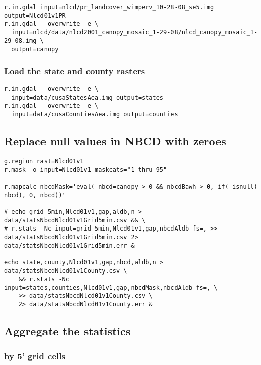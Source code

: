 \documentclass[11pt]{article}
\begin{document}
\begin{verbatim}
r.in.gdal input=nlcd/pr_landcover_wimperv_10-28-08_se5.img output=Nlcd01v1PR
r.in.gdal --overwrite -e \
  input=nlcd/data/nlcd2001_canopy_mosaic_1-29-08/nlcd_canopy_mosaic_1-29-08.img \
  output=canopy
\end{verbatim}
\subsubsection{Load the state and county rasters}
\label{sec-3-3-6}



\begin{verbatim}
r.in.gdal --overwrite -e \
  input=data/cusaStatesAea.img output=states
r.in.gdal --overwrite -e \
  input=data/cusaCountiesAea.img output=counties
\end{verbatim}
\subsection{Replace null values in NBCD with zeroes}
\label{sec-3-4}



\begin{verbatim}
g.region rast=Nlcd01v1
r.mask -o input=Nlcd01v1 maskcats="1 thru 95"

r.mapcalc nbcdMask='eval( nbcd=canopy > 0 && nbcdBawh > 0, if( isnull( nbcd), 0, nbcd))'

# echo grid_5min,Nlcd01v1,gap,aldb,n > data/statsNbcdNlcd01v1Grid5min.csv && \
# r.stats -Nc input=grid_5min,Nlcd01v1,gap,nbcdAldb fs=, >> data/statsNbcdNlcd01v1Grid5min.csv 2> data/statsNbcdNlcd01v1Grid5min.err &

echo state,county,Nlcd01v1,gap,nbcd,aldb,n > data/statsNbcdNlcd01v1County.csv \
    && r.stats -Nc input=states,counties,Nlcd01v1,gap,nbcdMask,nbcdAldb fs=, \
    >> data/statsNbcdNlcd01v1County.csv \
    2> data/statsNbcdNlcd01v1County.err &
\end{verbatim}
\subsection{Aggregate the statistics}
\label{sec-3-5}
\subsubsection{by 5' grid cells}
\label{sec-3-5-1}
\end{document}
